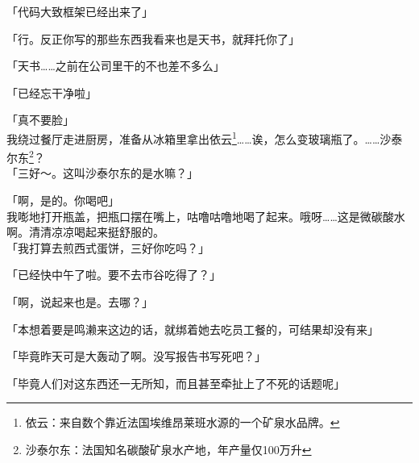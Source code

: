 「代码大致框架已经出来了」

「行。反正你写的那些东西我看来也是天书，就拜托你了」

「天书……之前在公司里干的不也差不多么」

「已经忘干净啦」

「真不要脸」\\

我绕过餐厅走进厨房，准备从冰箱里拿出依云\footnote{依云：来自数个靠近法国埃维昂莱班水源的一个矿泉水品牌。}……诶，怎么变玻璃瓶了。……沙泰尔东\footnote{沙泰尔东：法国知名碳酸矿泉水产地，年产量仅100万升}？\\

「三好～。这叫沙泰尔东的是水嘛？」

「啊，是的。你喝吧」\\

我嘭地打开瓶盖，把瓶口摆在嘴上，咕噜咕噜地喝了起来。哦呀……这是微碳酸水啊。清清凉凉喝起来挺舒服的。\\

「我打算去煎西式蛋饼，三好你吃吗？」

「已经快中午了啦。要不去市谷吃得了？」

「啊，说起来也是。去哪？」

「本想着要是鸣濑来这边的话，就绑着她去吃员工餐的，可结果却没有来」

「毕竟昨天可是大轰动了啊。没写报告书写死吧？」

「毕竟人们对这东西还一无所知，而且甚至牵扯上了不死的话题呢」\\

